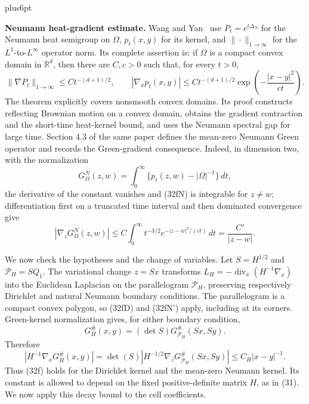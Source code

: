 \documentclass[11pt,reqno]{amsart}
\makeatletter
\theoremstyle{plain}
\theoremstyle{definition}
\theoremstyle{remark}
\renewenvironment{proof}[1][\proofname]{%
  \par
  \pushQED{\qed}%
  \normalfont
  \topsep6pt plus6pt\relax
  \trivlist
  \item[\hskip\labelsep\slshape #1\@addpunct{.}]%
  \ignorespaces
}{%
  \popQED
  \endtrivlist
  \@endpefalse
}
\DeclareRobustCommand{\qed}{%
  \leavevmode\unskip\penalty9999\hbox{}\nobreak
  \ifmmode
    \makebox[0pt][l]{\qquad\hbox{\qedsymbol}}%
  \else
    \qquad\hbox{\qedsymbol}%
  \fi
}
\renewcommand{\qedsymbol}{\rule[.47pt]{4pt}{6pt}}
\numberwithin{equation}{section}
\newcommand{\1}{\mathbf 1}
\makeatother
\begin{document}
\begin{proof}
\textbf{Neumann heat-gradient estimate.}  Wang and Yan~\cite[Theorem 1.2]{WangYan2010} use $P_ t=e^{t\Delta_ N}$ for the
Neumann heat semigroup on $\Omega$, $p_ t(x,y)$ for its kernel, and
$\|\cdot\|_ {1\to\infty}$ for the $L^1$-to-$L^\infty$ operator norm.
Its complete assertion is: if $\Omega$ is a compact convex domain in
$\mathbb R^d$, then there are $C,c>0$ such that, for every $t>0$,
\begin{equation}
\|\nabla P_ t\|_ {1\to\infty}\leq Ct^{-(d+1)/2},
\qquad
|\nabla_ xp_ t(x,y)|\leq Ct^{-(d+1)/2}
\exp\!\left(-\frac{|x-y|^2}{ct}\right).
\tag{32fN}
\end{equation}
The theorem explicitly covers nonsmooth convex domains.  Its proof
constructs reflecting Brownian motion on a convex domain, obtains the
gradient contraction and the short-time heat-kernel bound, and uses the
Neumann spectral gap for large time.  Section 4.3 of the same paper defines
the mean-zero Neumann Green operator and records the Green-gradient
consequence.  Indeed, in dimension two, with the normalization
\begin{equation*}
G^N_ \Omega(z,w)=\int_ 0^\infty
\{p_ t(z,w)-|\Omega|^{-1}\}\,dt,
\end{equation*}
the derivative of the constant vanishes and (32fN) is integrable for
$z\ne w$; differentiation first on a truncated time interval and then
dominated convergence give
\begin{equation}
|\nabla_ zG^N_ \Omega(z,w)|
\leq C\int_ 0^\infty t^{-3/2}
e^{-|z-w|^2/(ct)}\,dt
=\frac{C'}{|z-w|}.
\tag{32fN'}
\end{equation}

We now check the hypotheses and the change of variables.  Let
$S=H^{1/2}$ and $\mathcal P_ H=SQ_ 1$.  The variational change
$z=Sx$ transforms
$L_ H=-\operatorname {div}_ x(H^{-1}\nabla_ x)$ into the Euclidean
Laplacian on the parallelogram $\mathcal P_ H$, preserving respectively
Dirichlet and natural Neumann boundary conditions.  The parallelogram is
a compact convex polygon, so (32fD) and (32fN') apply, including at its
corners.  Green-kernel normalization gives, for either boundary condition,
\begin{equation*}
G_ H^\#(x,y)=(\det S)G_ {\mathcal P_ H}^\#(Sx,Sy).
\end{equation*}
Therefore
\begin{equation}
|H^{-1}\nabla_ xG_ H^\#(x,y)|
=\det(S)|H^{-1/2}\nabla_ zG_ {\mathcal P_ H}^\#(Sx,Sy)|
\leq C_ H|x-y|^{-1}.
\tag{32f}
\end{equation}
Thus (32f) holds for the Dirichlet kernel and the mean-zero Neumann
kernel.  Its constant is allowed to depend on the fixed
positive-definite matrix $H$, as in (31).  We now apply this decay
bound to the cell coefficients.


\end{proof}
\end{document}
